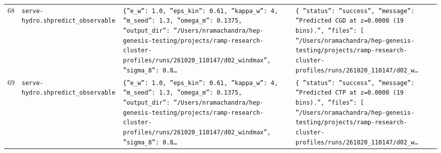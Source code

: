 \documentclass[11pt,a4paper]{article}
\begin{document}
\begin{longtable}{@{}p{}p{}p{}p{}@{}}
68 & \texttt{serve-hydro.sh}\newline\texttt{predict\_\allowbreak{}observable} & \texttt{\{''e\_\allowbreak{}w'':\allowbreak{} 1.0,\allowbreak{} ''eps\_\allowbreak{}kin'':\allowbreak{} 0.61,\allowbreak{} ''kappa\_\allowbreak{}w'':\allowbreak{} 4,\allowbreak{} ''m\_\allowbreak{}seed'':\allowbreak{} 1.3,\allowbreak{} ''omega\_\allowbreak{}m'':\allowbreak{} 0.1375,\allowbreak{} ''output\_\allowbreak{}dir'':\allowbreak{} ''/\allowbreak{}Users/\allowbreak{}nramachandra/\allowbreak{}hep-genesis-testing/\allowbreak{}projects/\allowbreak{}ramp-research-cluster-profiles/\allowbreak{}runs/\allowbreak{}261020\_\allowbreak{}110147/\allowbreak{}d02\_\allowbreak{}windmax'',\allowbreak{} ''sigma\_\allowbreak{}8'':\allowbreak{} 0.8\ldots{}\allowbreak{}} & \texttt{\{   ''status'':\allowbreak{} ''success'',\allowbreak{}   ''message'':\allowbreak{} ''Predicted CGD at z=\allowbreak{}0.0000 (19 bins)\allowbreak{}.'',\allowbreak{}   ''files'':\allowbreak{} [     ''/\allowbreak{}Users/\allowbreak{}nramachandra/\allowbreak{}hep-genesis-testing/\allowbreak{}projects/\allowbreak{}ramp-research-cluster-profiles/\allowbreak{}runs/\allowbreak{}261020\_\allowbreak{}110147/\allowbreak{}d02\_\allowbreak{}w\ldots{}\allowbreak{}} \\
69 & \texttt{serve-hydro.sh}\newline\texttt{predict\_\allowbreak{}observable} & \texttt{\{''e\_\allowbreak{}w'':\allowbreak{} 1.0,\allowbreak{} ''eps\_\allowbreak{}kin'':\allowbreak{} 0.61,\allowbreak{} ''kappa\_\allowbreak{}w'':\allowbreak{} 4,\allowbreak{} ''m\_\allowbreak{}seed'':\allowbreak{} 1.3,\allowbreak{} ''omega\_\allowbreak{}m'':\allowbreak{} 0.1375,\allowbreak{} ''output\_\allowbreak{}dir'':\allowbreak{} ''/\allowbreak{}Users/\allowbreak{}nramachandra/\allowbreak{}hep-genesis-testing/\allowbreak{}projects/\allowbreak{}ramp-research-cluster-profiles/\allowbreak{}runs/\allowbreak{}261020\_\allowbreak{}110147/\allowbreak{}d02\_\allowbreak{}windmax'',\allowbreak{} ''sigma\_\allowbreak{}8'':\allowbreak{} 0.8\ldots{}\allowbreak{}} & \texttt{\{   ''status'':\allowbreak{} ''success'',\allowbreak{}   ''message'':\allowbreak{} ''Predicted CTP at z=\allowbreak{}0.0000 (19 bins)\allowbreak{}.'',\allowbreak{}   ''files'':\allowbreak{} [     ''/\allowbreak{}Users/\allowbreak{}nramachandra/\allowbreak{}hep-genesis-testing/\allowbreak{}projects/\allowbreak{}ramp-research-cluster-profiles/\allowbreak{}runs/\allowbreak{}261020\_\allowbreak{}110147/\allowbreak{}d02\_\allowbreak{}w\ldots{}\allowbreak{}} \\

\end{longtable}
\end{document}
